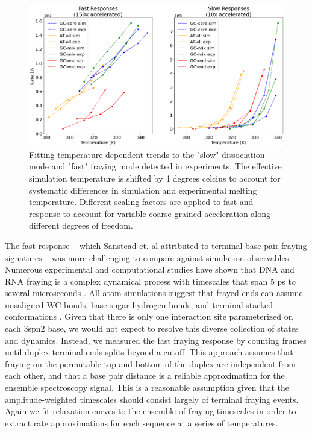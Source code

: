 \documentclass[journal=jpcbfk,manuscript=article]{achemso}
\begin{document}
\begin{figure}  %
	\begin{center}
        \includegraphics[width=\textwidth]{Fig2.pdf}
        \caption{Fitting temperature-dependent trends to the "slow" dissociation mode and "fast" fraying mode detected in experiments. The effective simulation temperature is shifted by 4 degrees celcius to account for systematic differences in simulation and experimental melting temperature. Different scaling factors are applied to fast and response to account for variable coarse-grained acceleration along different degrees of freedom.}
        \label{fig:relaxation-comparison}
	\end{center}
\end{figure}


The fast response -- which Sanstead et. al attributed to terminal base pair fraying signatures -- was more challenging to compare against simulation observables. Numerous experimental and computational studies have shown that DNA and RNA fraying is a complex dynamical process with timescales that span 5 ps to several microseconds \citep{ Nonin1995TerminalFraying, Nikolova2012ProbingSimulations, Andreatta2006UltrafastHelix, Galindo-Murillo2015ConvergenceDGCACGAACGAACGAACGC}. All-atom simulations suggest that frayed ends can assume misaligned WC bonds, base-sugar hydrogen bonds, and terminal stacked conformations \citep{PinamontiTheModels, Zgarbova2014BaseRNA}. Given that there is only one interaction site parameterized on each 3spn2 base, we would not expect to resolve this diverse collection of states and dynamics. Instead, we measured the fast fraying response by counting frames until duplex terminal ends splits beyond a cutoff. This approach assumes that fraying on the permutable top and bottom of the duplex are independent from each other, and that a base pair distance is a reliable approximation for the ensemble spectroscopy signal. This is a reasonable assumption given that the amplitude-weighted timescales should consist largely of terminal fraying events. Again we fit relaxation curves to the ensemble of fraying timescales in order to extract rate approximations for each sequence at a series of temperatures. 
\end{document}
